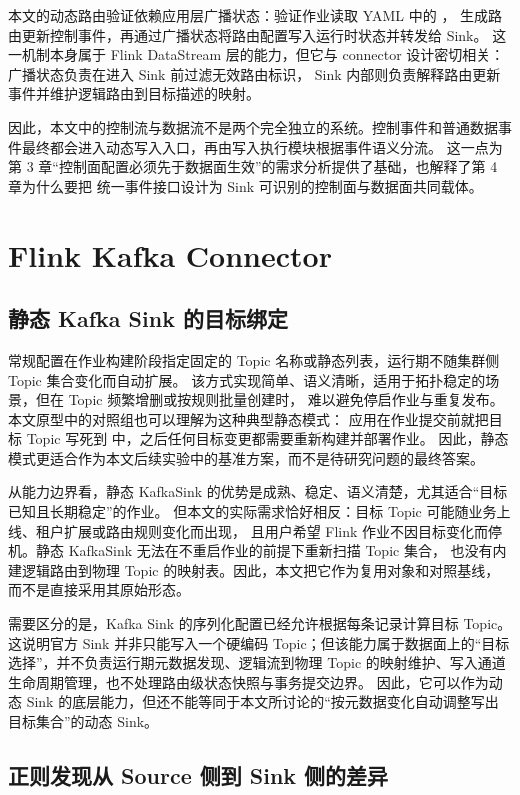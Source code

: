 本文的动态路由验证依赖应用层广播状态：验证作业读取 YAML 中的 ，
生成路由更新控制事件，再通过广播状态将路由配置写入运行时状态并转发给 Sink。
这一机制本身属于 Flink DataStream 层的能力，但它与 connector 设计密切相关：广播状态负责在进入 Sink 前过滤无效路由标识，
Sink 内部则负责解释路由更新事件并维护逻辑路由到目标描述的映射。

因此，本文中的控制流与数据流不是两个完全独立的系统。控制事件和普通数据事件最终都会进入动态写入入口，再由写入执行模块根据事件语义分流。
这一点为第 3 章“控制面配置必须先于数据面生效”的需求分析提供了基础，也解释了第 4 章为什么要把
统一事件接口设计为 Sink 可识别的控制面与数据面共同载体。

\section{Flink Kafka Connector}

\subsection{静态 Kafka Sink 的目标绑定}

常规配置在作业构建阶段指定固定的 Topic 名称或静态列表，运行期不随集群侧 Topic 集合变化而自动扩展。
该方式实现简单、语义清晰，适用于拓扑稳定的场景，但在 Topic 频繁增删或按规则批量创建时，
难以避免停启作业与重复发布。本文原型中的对照组也可以理解为这种典型静态模式：
应用在作业提交前就把目标 Topic 写死到  中，之后任何目标变更都需要重新构建并部署作业。
因此，静态模式更适合作为本文后续实验中的基准方案，而不是待研究问题的最终答案。

从能力边界看，静态 KafkaSink 的优势是成熟、稳定、语义清楚，尤其适合“目标已知且长期稳定”的作业。
但本文的实际需求恰好相反：目标 Topic 可能随业务上线、租户扩展或路由规则变化而出现，
且用户希望 Flink 作业不因目标变化而停机。静态 KafkaSink 无法在不重启作业的前提下重新扫描 Topic 集合，
也没有内建逻辑路由到物理 Topic 的映射表。因此，本文把它作为复用对象和对照基线，而不是直接采用其原始形态。

需要区分的是，Kafka Sink 的序列化配置已经允许根据每条记录计算目标 Topic\cite{flinkKafkaDocs}。
这说明官方 Sink 并非只能写入一个硬编码 Topic；但该能力属于数据面上的“目标选择”，并不负责运行期元数据发现、逻辑流到物理 Topic 的映射维护、写入通道生命周期管理，也不处理路由级状态快照与事务提交边界。
因此，它可以作为动态 Sink 的底层能力，但还不能等同于本文所讨论的“按元数据变化自动调整写出目标集合”的动态 Sink。

\subsection{正则发现从 Source 侧到 Sink 侧的差异}

